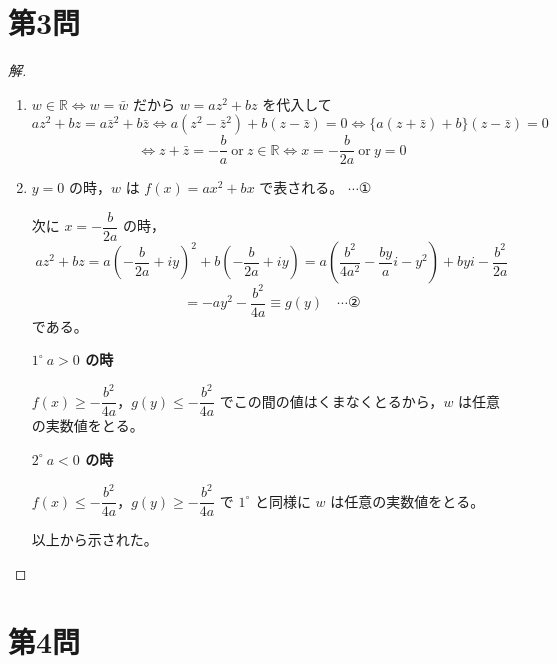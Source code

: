 \documentclass[../main.tex]{subfiles}
\begin{document}
\newpage

\section*{第3問}

\begin{proof}[解]
  \begin{enumerate}
    \item[(1)] $w\in\mathbb{R} \iff w=\bar w$ だから $w=az^2+bz$ を代入して
      \[
        az^2+bz=a\bar z^2+b\bar z
        \iff a(z^2-\bar z^2)+b(z-\bar z)=0
        \iff \{a(z+\bar z)+b\}(z-\bar z)=0
      \]
      \[
        \iff z+\bar z=-\frac{b}{a}\ \text{or}\ z\in\mathbb{R}
        \iff x=-\frac{b}{2a}\ \text{or}\ y=0
      \]

    \item[(2)] $y=0$ の時，$w$ は $f(x)=ax^2+bx$ で表される。 $\cdots$①

      次に $x=-\dfrac{b}{2a}$ の時，
      \[
        az^2+bz = a\left(-\frac{b}{2a}+iy\right)^2+b\left(-\frac{b}{2a}+iy\right)
        = a\left(\frac{b^2}{4a^2}-\frac{by}{a}i-y^2\right)+byi-\frac{b^2}{2a}
      \]
      \[
        = -ay^2-\frac{b^2}{4a} \equiv g(y) \quad \cdots \text{②}
      \]
      である。

      \textbf{$1^\circ\ a>0$ の時}

      $f(x)\ge-\dfrac{b^2}{4a}$，$g(y)\le-\dfrac{b^2}{4a}$ でこの間の値はくまなくとるから，$w$ は任意の実数値をとる。

      \textbf{$2^\circ\ a<0$ の時}

      $f(x)\le-\dfrac{b^2}{4a}$，$g(y)\ge-\dfrac{b^2}{4a}$ で $1^\circ$ と同様に $w$ は任意の実数値をとる。

      以上から示された。
  \end{enumerate}
\end{proof}

\newpage

\section*{第4問}
\end{document}
